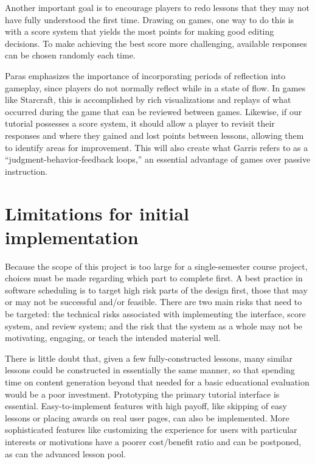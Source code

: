 \documentclass{acm_proc_article-sp}
\begin{document}
Another important goal is to encourage players to redo lessons that they may not have fully understood the first time. Drawing on games, one way to do this is with a score system that yields the most points for making good editing decisions. To make achieving the best score more challenging, available responses can be chosen randomly each time.

Paras\cite{Paras:2005} emphasizes the importance of incorporating periods of reflection into gameplay, since players do not normally reflect while in a state of flow. In games like Starcraft, this is accomplished by rich visualizations and replays of what occurred during the game that can be reviewed between games. Likewise, if our tutorial possesses a score system, it should allow a player to revisit their responses and where they gained and lost points between lessons, allowing them to identify areas for improvement. This will also create what Garris\cite{Garris:2002} refers to as a ``judgment-behavior-feedback loops,'' an essential advantage of games over passive instruction.

\section{Limitations for initial implementation}

Because the scope of this project is too large for a single-semester course project, choices must be made regarding which part to complete first. A best practice in software scheduling is to target high risk parts of the design first, those that may or may not be successful and/or feasible.\cite{Boehm:1988} There are two main risks that need to be targeted: the technical risks associated with implementing the interface, score system, and review system; and the risk that the system as a whole may not be motivating, engaging, or teach the intended material well.

There is little doubt that, given a few fully-constructed lessons, many similar lessons could be constructed in essentially the same manner, so that spending time on content generation beyond that needed for a basic educational evaluation would be a poor investment. Prototyping the primary tutorial interface is essential. Easy-to-implement features with high payoff, like skipping of easy lessons or placing awards on real user pages, can also be implemented. More sophisticated features like customizing the experience for users with particular interests or motivations have a poorer cost/benefit ratio and can be postponed, as can the advanced lesson pool.
\end{document}
